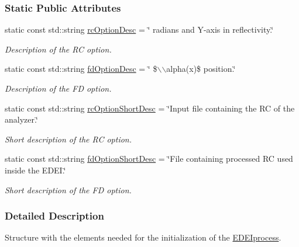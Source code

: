 \subsubsection*{Static Public Attributes}
\begin{DoxyCompactItemize}
\item 
static const std::string \hyperlink{group__edeiedei_ga4ca0ca5e3acea8517ed7806eca3b9f71}{rcOptionDesc} = \char`\"{} radians and Y-\/axis in reflectivity.\char`\"{}
\begin{DoxyCompactList}\small\item\em Description of the RC option. \item\end{DoxyCompactList}\item 
static const std::string \hyperlink{group__edeiedei_ga1d5c3f1289ef962d44d52f344e932369}{fdOptionDesc} = \char`\"{} \$$\backslash$$\backslash$alpha(x)\$ position.\char`\"{}
\begin{DoxyCompactList}\small\item\em Description of the FD option. \item\end{DoxyCompactList}\item 
static const std::string \hyperlink{group__edeiedei_gaf8b9f6e9837dd2d85f8c01071a69b06e}{rcOptionShortDesc} = \char`\"{}Input file containing the RC of the analyzer.\char`\"{}
\begin{DoxyCompactList}\small\item\em Short description of the RC option. \item\end{DoxyCompactList}\item 
static const std::string \hyperlink{group__edeiedei_ga270b21583b3f075758bd30fd3df8f7fa}{fdOptionShortDesc} = \char`\"{}File containing processed RC used inside the EDEI.\char`\"{}
\begin{DoxyCompactList}\small\item\em Short description of the FD option. \item\end{DoxyCompactList}\end{DoxyCompactItemize}


\subsubsection{Detailed Description}
Structure with the elements needed for the initialization of the \hyperlink{classEDEIprocess}{EDEIprocess}. 

